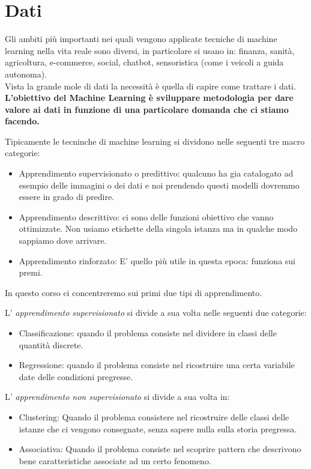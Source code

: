 \pagestyle{fancy}
\cfoot{\thepage}
\renewcommand{\footrulewidth}{0.25pt}


\section{Dati}
Gli ambiti più importanti nei quali vengono applicate tecniche di machine learning nella vita reale sono diversi, in particolare si usano in:
finanza, sanità, agricoltura, e-commerce, social, chatbot, sensoristica (come i veicoli a guida autonoma).
\\ Vista la grande mole di dati la necessità è quella di capire come trattare i dati.
\textbf{L'obiettivo del Machine Learning è sviluppare metodologia per dare valore ai dati in funzione di una particolare domanda che ci stiamo facendo.}

Tipicamente le tecninche di machine learning si dividono nelle seguenti tre macro categorie:
\begin{itemize}
	\item Apprendimento supervisionato o predittivo: qualcuno ha gia catalogato ad esempio delle immagini o dei dati e noi prendendo questi modelli dovremmo essere in grado di predire.
	\item Apprendimento descrittivo: ci sono delle funzioni obiettivo che vanno ottimizzate. Non usiamo etichette della singola istanza ma in qualche modo sappiamo dove arrivare.
	\item Apprendimento rinforzato: E' quello più utile in questa epoca: funziona sui premi.
\end{itemize}

In questo corso ci concentreremo sui primi due tipi di apprendimento.

L' \textit{apprendimento supervisionato} si divide a sua volta nelle seguenti due categorie:
\begin{itemize}
	\item Classificazione: quando il problema consiste nel dividere in classi delle quantità discrete.
	\item Regressione: quando il problema consiste nel ricostruire una certa variabile date delle condizioni pregresse.
\end{itemize}

L' \textit{apprendimento non supervisionato} si divide a sua volta in:
\begin{itemize}
	\item Clustering: Quando il problema consistere nel ricostruire delle classi delle istanze che ci vengono consegnate, senza sapere nulla sulla storia pregressa.
	\item Associativa: Quando il problema consiste nel scoprire pattern che descrivono bene caratteristiche associate ad un certo fenomeno.
\end{itemize}

